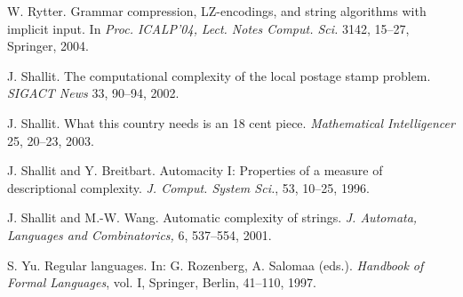 \documentclass[copyright]{eptcs}
\begin{document}
{\begin{thebibliography}{99}
 W. Rytter. Grammar compression, LZ-encodings,
and string algorithms with implicit input.
In {\em Proc. ICALP'04,} {\em Lect. Notes Comput. Sci.} 3142,
15--27, Springer, 2004.



 J. Shallit. The computational complexity of the local
postage stamp problem. {\em SIGACT News} 33, 90--94, 2002.

 J. Shallit.
What this country needs is an 18 cent piece.
{\em Mathematical Intelligencer} 25,  20--23, 2003.

 J. Shallit and Y. Breitbart. Automacity I: Properties of
a measure of descriptional complexity.
{\em J. Comput. System Sci.}, 53, 10--25, 1996.

 J. Shallit and M.-W. Wang.
Automatic complexity of strings.
{\em J. Automata, Languages and Combinatorics,} 6,  537--554, 2001.





 S. Yu. Regular languages.
In: G. Rozenberg, A. Salomaa (eds.). {\em  Handbook of
Formal Languages}, vol. I, Springer, Berlin,   41--110, 1997.




\end{thebibliography}
} 
\end{document}
